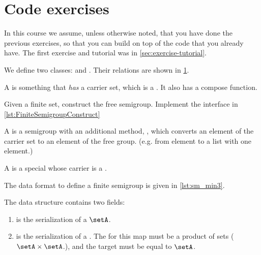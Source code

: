 \section{Code exercises}

\begin{remark}
    In this course we assume, unless otherwise noted, that you have done the previous exercises, so that you can build on top of the code that you already have. The first exercise and tutorial was in \cref{sec:exercise-tutorial}.
\end{remark}

\begin{figure*}[b]
    \label{fig:uml_semigroup}
\end{figure*}

We define two classes: \Semigroup and \FiniteSemigroup.
Their relations are shown in \cref{fig:uml_semigroup}.

A \Semigroup is something that \emph{has} a carrier set, which is a \Setoid.
It also has a compose function.



\begin{codeexercise}
    \label{ex:TestFiniteSemigroupConstruct}
    Given a finite set, construct the free semigroup.
    Implement the interface in \cref{lst:FiniteSemigroupConstruct}
\end{codeexercise}


A \FreeSemigroup is a semigroup with an additional method, , which converts an element of the carrier set to an element of the free group. (e.g. from element to a list with one element.)




A \FiniteSemigroup is a special \Semigroup whose carrier is a \FiniteSet.




The data format to define a finite semigroup is given in \cref{lst:sm_min3}.

The data structure contains two fields:
\begin{enumerate}
    \item {} is the serialization of a \FiniteSet $\setA$.
    \item {} is the serialization of a \FiniteMap. The 
    for this map must be a product of sets ($\setA \times \setA$.), and the target must be equal to $\setA$.
\end{enumerate}

